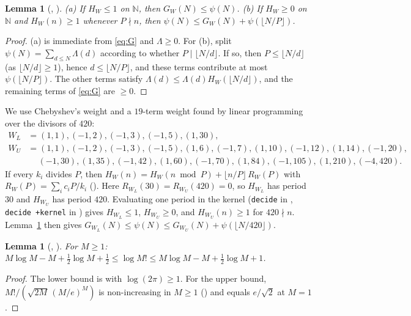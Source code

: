 \documentclass[11pt]{amsart}
\theoremstyle{plain}
\newtheorem{lemma}[theorem]{Lemma}
\theoremstyle{definition}
\newcommand{\N}{\mathbb{N}}
\newcommand{\fl}[1]{\lfloor #1\rfloor}
\begin{document}
\begin{lemma}[, ]\label{lem:weights}
\textup{(a)} If $H_W\le1$ on $\N$, then $G_W(N)\le\psi(N)$.
\textup{(b)} If $H_W\ge0$ on $\N$ and $H_W(n)\ge1$ whenever $P\nmid n$, then $\psi(N)\le G_W(N)+\psi(\fl{N/P})$.
\end{lemma}

\begin{proof}
(a) is immediate from \eqref{eq:G} and $\Lambda\ge0$. For (b), split $\psi(N)=\sum_{d\le N}\Lambda(d)$ according to whether $P\mid\fl{N/d}$. If so, then $P\le\fl{N/d}$ (as $\fl{N/d}\ge1$), hence $d\le\fl{N/P}$, and these terms contribute at most $\psi(\fl{N/P})$. The other terms satisfy $\Lambda(d)\le\Lambda(d)H_W(\fl{N/d})$, and the remaining terms of \eqref{eq:G} are $\ge0$.
\end{proof}

We use Chebyshev's weight \cite{Cheb} and a $19$-term weight found by linear programming over the divisors of $420$:
\begin{align*}
W_L&=(1,1),(-1,2),(-1,3),(-1,5),(1,30),\\
W_U&=(1,1),(-1,2),(-1,3),(-1,5),(1,6),(-1,7),(1,10),(-1,12),(1,14),(-1,20),\\
&\quad\ (-1,30),(1,35),(-1,42),(1,60),(-1,70),(1,84),(-1,105),(1,210),(-4,420).
\end{align*}
If every $k_i$ divides $P$, then $H_W(n)=H_W(n\bmod P)+\fl{n/P}\,R_W(P)$ with $R_W(P)=\sum_ic_iP/k_i$ (). Here $R_{W_L}(30)=R_{W_U}(420)=0$, so $H_{W_L}$ has period $30$ and $H_{W_U}$ has period $420$. Evaluating one period in the kernel (\texttt{decide} in , \texttt{decide +kernel} in ) gives $H_{W_L}\le1$, $H_{W_U}\ge0$, and $H_{W_U}(n)\ge1$ for $420\nmid n$. Lemma~\ref{lem:weights} then gives $G_{W_L}(N)\le\psi(N)\le G_{W_U}(N)+\psi(\fl{N/420})$.

\begin{lemma}[, ]\label{lem:stirling}
For $M\ge1$: $M\log M-M+\tfrac12\log M+\tfrac12\le\log M!\le M\log M-M+\tfrac12\log M+1$.
\end{lemma}

\begin{proof}
The lower bound is  with $\log(2\pi)\ge1$. For the upper bound, $M!/(\sqrt{2M}\,(M/e)^M)$ is non-increasing in $M\ge1$ () and equals $e/\sqrt2$ at $M=1$.
\end{proof}
\end{document}
